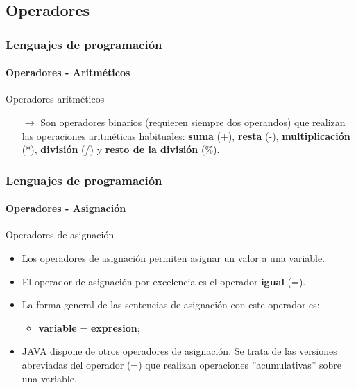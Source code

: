 \documentclass{beamer}
\begin{document}
		\subsection{Operadores}

		\begin{frame}
			\frametitle{Lenguajes de programaci\'on} 
			\framesubtitle{Operadores - Aritm\'eticos}

			\begin{block}{Operadores aritm\'eticos}
				\begin{itemize}
					\item[$\rightarrow$] Son operadores binarios (requieren siempre dos operandos) que realizan las operaciones aritm\'eticas habituales: \textbf{suma} (+), \textbf{resta} (-), \textbf{multiplicaci\'on} (*), \textbf{divisi\'on} (/) y \textbf{resto de la divisi\'on} (\%).
				\end{itemize}
			\end{block}
		\end{frame}

		\begin{frame}
			\frametitle{Lenguajes de programaci\'on} 
			\framesubtitle{Operadores - Asignaci\'on}

			\begin{block}{Operadores de asignaci\'on}
				\begin{itemize}
					\item Los operadores de asignaci\'on permiten asignar un valor a una variable.
					\item El operador de asignaci\'on por excelencia es el operador \textbf{igual} (=). 
					\item La forma general de las sentencias de asignaci\'on con este operador es:
					\begin{itemize}
						\item \textbf{variable} = \textbf{expresion};
					\end{itemize}
					\item JAVA dispone de otros operadores de asignaci\'on. Se trata de las versiones abreviadas del operador (=) que realizan operaciones ''acumulativas'' sobre una variable.
				\end{itemize}
			\end{block}
		\end{frame}
\end{document}
